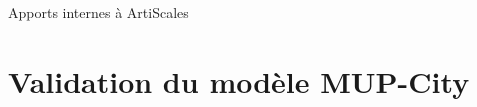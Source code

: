 \documentclass[xcolor=table]{beamer}
\begin{document}
\begin{frame}{Apports internes à ArtiScales}
\end{frame}


\section{Validation du modèle MUP-City}
\end{document}
